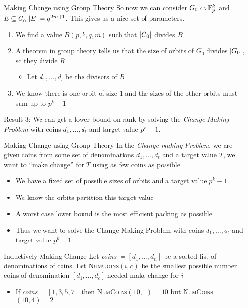 \documentclass[aspectratio=169]{beamer}
\begin{document}
\begin{frame}{Making Change using Group Theory}
    So now we can consider $G_0 \curvearrowright \mathbb{F}_p^k$ and $E \subseteq G_0$ $\abs{E} = q^{2m + 1}$.
    This gives us a nice set of parameters.

    \begin{enumerate}
        \item We find a value $B(p, k, q, m)$ such that $\abs{G_0}$ divides $B$ \pause
        \item A theorem in group theory tells us that the size of orbits of $G_0$ divides $\abs{G_0}$, so they divide $B$
        \begin{itemize}
            \item Let $d_1, \ldots, d_t$ be the divisors of $B$
        \end{itemize}
        \item We know there is one orbit of size $1$ and the sizes of the other orbits must sum up to $p^k - 1$ \pause
    \end{enumerate}

    \textcolor{sigma@mainblue}{Result 3: } We can get a lower bound on rank by solving the \emph{Change Making Problem} with coins $d_1, \ldots, d_t$ and target value $p^k - 1$.    
\end{frame}

\begin{frame}{Making Change using Group Theory}
    In the \emph{Change-making Problem}, we are given coins from some set of denominations $d_1, \ldots, d_t$ and a target value $T$, we want to ``make change'' for $T$ using as few coins as possible

    \vspace{20pt}
    
    \begin{itemize}
        \item We have a fixed set of possible sizes of orbits and a target value $p^k - 1$ \pause
        \item We know the orbits partition this target value \pause
        \item A worst case lower bound is the most efficient packing as possible
        \item Thus we want to solve the Change Making Problem with coins $d_1, \ldots, d_t$ and target value $p^k - 1$.    
    \end{itemize}
\end{frame}

\begin{frame}{Inductively Making Change}
    Let \emph{coins} $= [d_1, \ldots, d_n]$ be a sorted list of denominations of coins.
    Let \textsc{NumCoins}$(i, c)$ be the smallest possible number coins of denomination $[d_1, \ldots, d_c]$ needed make change for $i$
    \begin{itemize}
        \item If \emph{coins} = $[1, 3, 5, 7]$ then \textsc{NumCoins}$(10, 1) = 10$ but \textsc{NumCoins}$(10, 4) = 2$
    \end{itemize}
\end{frame}
\end{document}
